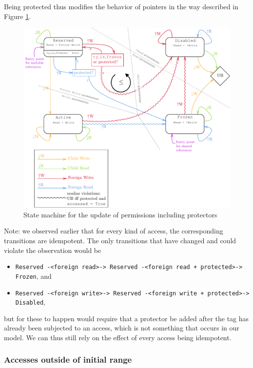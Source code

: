 \documentclass[a4paper,11pt]{article}
\theoremstyle{plain}
\theoremstyle{definition}
\theoremstyle{remark}
\newcommand{\tperm}[1]{\texttt{#1}}
\begin{document}
Being protected thus modifies the behavior of pointers in the way described in Figure \ref{fig:state-machine}.

\begin{figure}
    \includegraphics[width=\textwidth]{../figs/state-machine.pdf}
    \caption{State machine for the update of permissions including protectors}
    \label{fig:state-machine}
\end{figure}

Note: we observed earlier that for every kind of access, the corresponding transitions
are idempotent. The only transitions that have changed and could violate the observation would be

\begin{itemize}
    \item \tperm{Reserved -<foreign read>-> Reserved -<foreign read + protected>-> Frozen}, and
    \item \tperm{Reserved -<foreign write>-> Reserved -<foreign write + protected>-> Disabled},
\end{itemize}

but for these to happen would require that a protector be added after the tag has already been
subjected to an access, which is not something that occurs in our model.
We can thus still rely on the effect of every access being idempotent.

\subsubsection{Accesses outside of initial range}
\end{document}
